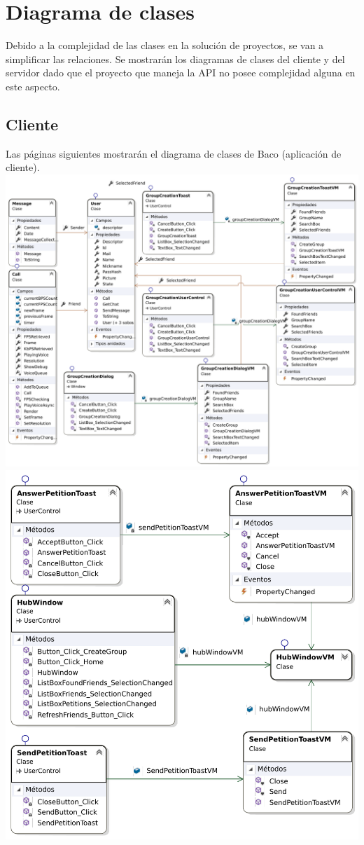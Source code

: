 \documentclass[12pt, a4paper]{book} %
\begin{document}
		\section{Diagrama de clases}
		Debido a la complejidad de las clases en la solución de proyectos, se van a simplificar las relaciones. Se mostrarán los diagramas de clases del cliente y del servidor dado que el proyecto que maneja la API no posee complejidad alguna en este aspecto.
			\subsection{Cliente}
			Las páginas siguientes mostrarán el diagrama de clases de Baco (aplicación de cliente).\\
			\includegraphics[width=\textwidth,height=\textheight, keepaspectratio]{img/BacoClientDiagram1.pdf}\\
			\includegraphics[width=\textwidth,height=\textheight, keepaspectratio]{img/BacoClientDiagram2.pdf}\\
\end{document}
